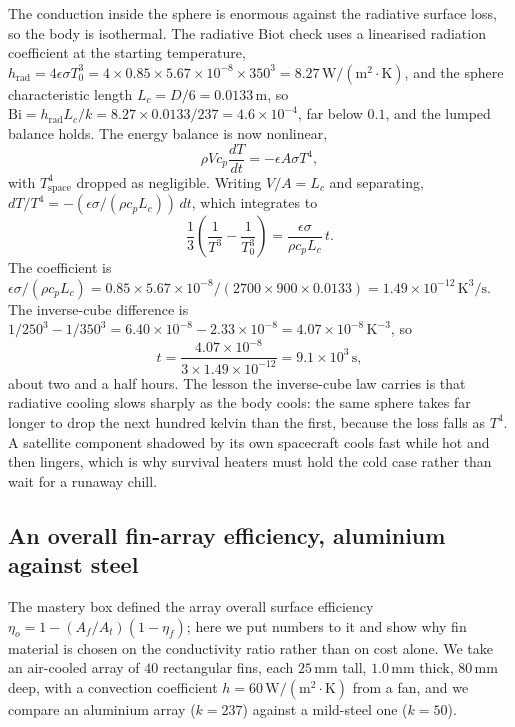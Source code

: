 The conduction inside the sphere is enormous against the radiative surface
loss, so the body is isothermal. The radiative Biot check uses a
linearised radiation coefficient at the starting temperature,
$h_{\text{rad}} = 4\epsilon\sigma T_0^3 = 4 \times 0.85 \times 5.67
\times 10^{-8} \times 350^3 = 8.27\,\text{W}/(\text{m}^2\cdot\si{\kelvin})$,
and the sphere characteristic length $L_c = D/6 = 0.0133\,\text{m}$, so
$\text{Bi} = h_{\text{rad}} L_c/k = 8.27 \times 0.0133/237 = 4.6 \times
10^{-4}$, far below $0.1$, and the lumped balance holds. The energy
balance is now nonlinear,
\[
\rho V c_p \frac{dT}{dt} = -\epsilon A \sigma T^4,
\]
with $T_{\text{space}}^4$ dropped as negligible. Writing $V/A = L_c$ and
separating, $dT/T^4 = -(\epsilon\sigma/(\rho c_p L_c))\,dt$, which
integrates to
\[
\frac{1}{3}\!\left(\frac{1}{T^3} - \frac{1}{T_0^3}\right) =
\frac{\epsilon\sigma}{\rho c_p L_c}\,t.
\]
The coefficient is $\epsilon\sigma/(\rho c_p L_c) = 0.85 \times 5.67
\times 10^{-8}/(2700 \times 900 \times 0.0133) = 1.49 \times 10^{-12}\,
\si{\kelvin}^3/\text{s}$. The inverse-cube difference is $1/250^3 -
1/350^3 = 6.40 \times 10^{-8} - 2.33 \times 10^{-8} = 4.07 \times
10^{-8}\,\si{\kelvin}^{-3}$, so
\[
t = \frac{4.07 \times 10^{-8}}{3 \times 1.49 \times 10^{-12}} = 9.1
\times 10^3\,\text{s},
\]
about two and a half hours. The lesson the inverse-cube law carries is
that radiative cooling slows sharply as the body cools: the same sphere
takes far longer to drop the next hundred kelvin than the first, because
the loss falls as $T^4$. A satellite component shadowed by its own
spacecraft cools fast while hot and then lingers, which is why survival
heaters must hold the cold case rather than wait for a runaway chill.

\subsection{An overall fin-array efficiency, aluminium against steel}

The mastery box defined the array overall surface efficiency $\eta_o = 1 -
(A_f/A_t)(1 - \eta_f)$; here we put numbers to it and show why fin
material is chosen on the conductivity ratio rather than on cost alone. We
take an air-cooled array of $40$ rectangular fins, each $25\,\si{
\milli\meter}$ tall, $1.0\,\si{\milli\meter}$ thick, $80\,\si{\milli\meter}$
deep, with a convection coefficient $h = 60\,\text{W}/(\text{m}^2\cdot
\si{\kelvin})$ from a fan, and we compare an aluminium array ($k =
237$) against a mild-steel one ($k = 50$).

